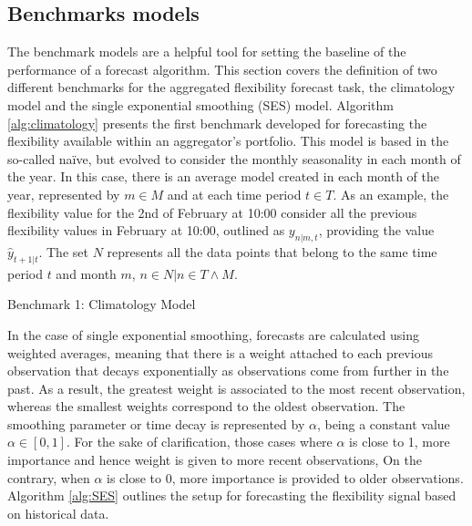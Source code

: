 \subsection{Benchmarks models}

The benchmark models are a helpful tool for setting the baseline of the performance of a forecast algorithm. This section covers the definition of two different benchmarks for the aggregated flexibility forecast task, the climatology model and the single exponential smoothing (SES) model. Algorithm \ref{alg:climatology} presents the first benchmark developed for forecasting the flexibility available within an aggregator's portfolio. This model is based in the so-called na\"{i}ve, but evolved to consider the monthly seasonality in each month of the year. In this case, there is an average model created in each month of the year, represented by $m \in M$ and at each time period $t \in T$. As an example, the flexibility value for the 2nd of February at 10:00 consider all the previous flexibility values in February at 10:00, outlined as $y_{n|m,t}$,  providing the value $\hat{y}_{t+1|t}$. The set $N$ represents all the data points that belong to the same time period $t$ and month $m$, $n \in N | n \in  T \wedge M$. 

\begin{algorithm}
	\SetAlgoLined
	\caption{Benchmark 1: Climatology Model}
	\label{alg:climatology}
\end{algorithm}

In the case of single exponential smoothing, forecasts are calculated using weighted averages, meaning that there is a weight attached to each previous observation that decays exponentially as observations come from further in the past. As a result, the greatest weight is associated to the most recent observation, whereas the smallest weights correspond to the oldest observation. The smoothing parameter or time decay is represented by $\alpha$, being a constant value $\alpha \in [0,1]$. For the sake of clarification, those cases where $\alpha$ is close to 1, more importance and hence weight is given to more recent observations, On the contrary, when $\alpha$ is close to 0, more importance is provided to older observations. Algorithm \ref{alg:SES} outlines the setup for forecasting the flexibility signal based on historical data. 


